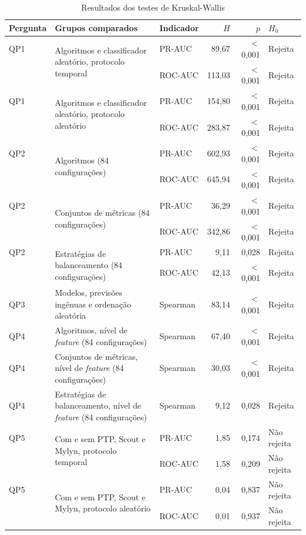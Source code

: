 \begin{table}[htbp]
    
    \centering
    \footnotesize
    \setlength{\tabcolsep}{4pt}%
    \caption{Resultados dos testes de Kruskal-Wallis}
    \label{tab:res-kw}
    \begin{tabular}{lp{6.6cm}lrrl}
        \toprule
        Pergunta & Grupos comparados & Indicador & $H$ & $p$ & $H_0$ \\
        \midrule
        QP1 & \multirow{2}{=}{Algoritmos e classificador aleatório, protocolo temporal} & PR-AUC & 89,67 & $<$ 0,001 & Rejeita \\
         & & ROC-AUC & 113,03 & $<$ 0,001 & Rejeita \\
        \midrule
        QP1 & \multirow{2}{=}{Algoritmos e classificador aleatório, protocolo aleatório} & PR-AUC & 154,80 & $<$ 0,001 & Rejeita \\
         & & ROC-AUC & 283,87 & $<$ 0,001 & Rejeita \\
        \midrule
        QP2 & \multirow{2}{=}{Algoritmos (84 configurações)} & PR-AUC & 602,93 & $<$ 0,001 & Rejeita \\
         & & ROC-AUC & 645,94 & $<$ 0,001 & Rejeita \\
        \midrule
        QP2 & \multirow{2}{=}{Conjuntos de métricas (84 configurações)} & PR-AUC & 36,29 & $<$ 0,001 & Rejeita \\
         & & ROC-AUC & 342,86 & $<$ 0,001 & Rejeita \\
        \midrule
        QP2 & \multirow{2}{=}{Estratégias de balanceamento (84 configurações)} & PR-AUC & 9,11 & 0,028 & Rejeita \\
         & & ROC-AUC & 42,13 & $<$ 0,001 & Rejeita \\
        \midrule
        QP3 & Modelos, previsões ingênuas e ordenação aleatória & Spearman & 83,14 & $<$ 0,001 & Rejeita \\
        \midrule
        QP4 & Algoritmos, nível de \textit{feature} (84 configurações) & Spearman & 67,40 & $<$ 0,001 & Rejeita \\
        \midrule
        QP4 & Conjuntos de métricas, nível de \textit{feature} (84 configurações) & Spearman & 30,03 & $<$ 0,001 & Rejeita \\
        \midrule
        QP4 & Estratégias de balanceamento, nível de \textit{feature} (84 configurações) & Spearman & 9,12 & 0,028 & Rejeita \\
        \midrule
        QP5 & \multirow{2}{=}{Com e sem PTP, Scout e Mylyn, protocolo temporal} & PR-AUC & 1,85 & 0,174 & Não rejeita \\
         & & ROC-AUC & 1,58 & 0,209 & Não rejeita \\
        \midrule
        QP5 & \multirow{2}{=}{Com e sem PTP, Scout e Mylyn, protocolo aleatório} & PR-AUC & 0,04 & 0,837 & Não rejeita \\
         & & ROC-AUC & 0,01 & 0,937 & Não rejeita \\
        \bottomrule
    \end{tabular}
\end{table}%
